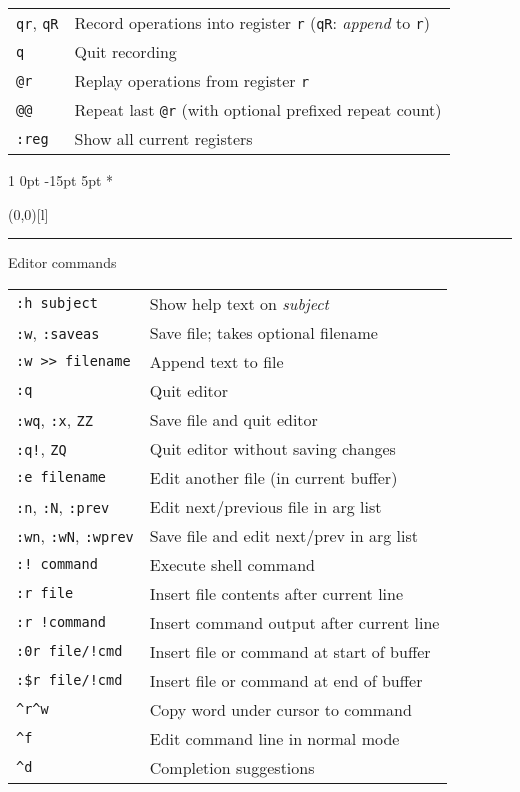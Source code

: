 \documentclass[a4paper, landscape, 10pt]{article}
\makeatletter
\renewcommand{\section}{%
    \@startsection{section}%
        {1}%
        {0pt}%
        {-15pt}%
        {5pt}%
        {\fontsize{14pt}{12pt}\fontseries{ub}\selectfont\color{accentcolor}}}
\newcommand{\V}[1]{\texttt{\textup{#1}}}
\newcommand{\topic}[1]{\section*{\protect\makebox(0,0)[l]{\color{accentcolor!80}\rule[8pt]{\columnwidth}{19pt}}\hspace{.5em}\color{white}#1}}
\makeatother
\begin{document}
\begin{multicols*}{3}
\begin{tabularx}{\columnwidth}{l>{\raggedright\arraybackslash}X}
\V{qr}, \V{qR}
        &Record operations into register \V{r} (\V{qR}: \emph{append} to \V{r})\\
\V{q}
        &Quit recording\\
\V{@r}
        &Replay operations from register \V{r}\\
\V{@@}
        &Repeat last \V{@r} (with optional prefixed repeat count)\\
\V{:reg}
        &Show all current registers
    \end{tabularx}



    \pagebreak



\topic{Editor commands}
    \begin{tabularx}{\columnwidth}{l>{\raggedright\arraybackslash}X}
\V{:h subject}
        &Show help text on \emph{subject}\\
\V{:w}, \V{:saveas}
        &Save file; takes optional filename\\
\V{:w >{}> filename}
        &Append text to file\\
\V{:q}
        &Quit editor\\
\V{:wq}, \V{:x}, \V{ZZ}
        &Save file and quit editor\\
\V{:q!}, \V{ZQ}
        &Quit editor without saving changes\\
\V{:e filename}
        &Edit another file (in current buffer)\\
\V{:n}, \V{:N}, \V{:prev}
        &Edit next/previous file in arg list\\
\V{:wn}, \V{:wN}, \V{:wprev}
        &Save file and edit next/prev in arg list\\
\V{:! command}
        &Execute shell command\\
\V{:r file}
        &Insert file contents after current line\\
\V{:r !command}
        &Insert command output after current line\\
\V{:0r file/!cmd}
        &Insert file or command at start of buffer\\
\verb|:$r file/!cmd|
        &Insert file or command at end of buffer\\

\verb|^r^w|
        &Copy word under cursor to command\\
\verb|^f|
        &Edit command line in normal mode\\
\verb|^d|
        &Completion suggestions
    \end{tabularx}


\end{multicols*}
\end{document}
